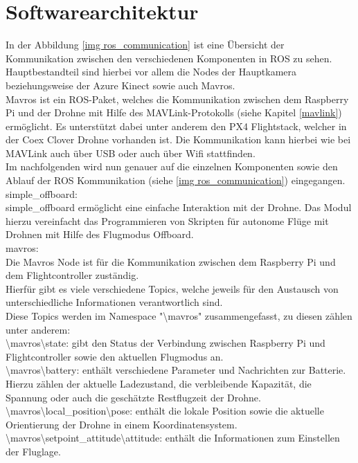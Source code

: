 \section{Softwarearchitektur} \label{softwarearchitektur:section}

In der Abbildung \ref{img ros_communication} ist eine Übersicht der Kommunikation zwischen den verschiedenen Komponenten in \ac{ROS} zu sehen. \\
Hauptbestandteil sind hierbei vor allem die Nodes der Hauptkamera beziehungsweise der Azure Kinect sowie auch Mavros. \\
Mavros ist ein ROS-Paket, welches die Kommunikation zwischen dem Raspberry Pi und der Drohne mit Hilfe des MAVLink-Protokolls (siehe Kapitel \ref{mavlink}) ermöglicht. Es unterstützt dabei unter anderem den PX4 Flightstack, welcher in der Coex Clover Drohne vorhanden ist. Die Kommunikation kann hierbei wie bei MAVLink auch über \ac{USB} oder auch über Wifi stattfinden. \cite[vgl.][]{mavros}\\
Im nachfolgenden wird nun genauer auf die einzelnen Komponenten sowie den Ablauf der ROS Kommunikation (siehe \ref{img ros_communication}) eingegangen. \\

simple\_offboard: \\
simple\_offboard ermöglicht eine einfache Interaktion mit der Drohne. Das Modul hierzu vereinfacht das Programmieren von Skripten für autonome Flüge mit Drohnen mit Hilfe des Flugmodus Offboard. \cite[vgl.][]{simple_offboard}\\

mavros: \\
Die Mavros Node ist für die Kommunikation zwischen dem Raspberry Pi und dem Flightcontroller zuständig.\\
Hierfür gibt es viele verschiedene Topics, welche jeweils für den Austausch von unterschiedliche Informationen verantwortlich sind.\\
Diese Topics werden im Namespace "\textbackslash mavros" zusammengefasst, zu diesen zählen unter anderem:\\
\textbackslash mavros\textbackslash state: gibt den Status der Verbindung zwischen Raspberry Pi und Flightcontroller sowie den aktuellen Flugmodus an.\\
\textbackslash mavros\textbackslash battery: enthält verschiedene Parameter und Nachrichten zur Batterie. Hierzu zählen der aktuelle Ladezustand, die verbleibende Kapazität, die Spannung oder auch die geschätzte Restflugzeit der Drohne.\\
\textbackslash mavros\textbackslash local\_position\textbackslash pose: enthält die lokale Position sowie die aktuelle Orientierung der Drohne in einem Koordinatensystem.\\
\textbackslash mavros\textbackslash setpoint\_attitude\textbackslash attitude: enthält die Informationen zum Einstellen der Fluglage. \cite[vgl.][]{mavros}\\
 
